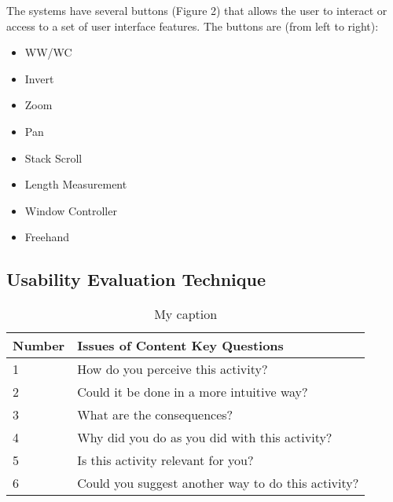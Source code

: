 The systems have several buttons (Figure 2) that allows the user to interact or access to a set of user interface features. The buttons are (from left to right):

\begin{itemize}
  \item WW/WC
  \item Invert
  \item Zoom
  \item Pan
  \item Stack Scroll
  \item Length Measurement
  \item Window Controller
  \item Freehand
\end{itemize}

\subsection{Usability Evaluation Technique}

\begin{table}[h]
\centering
\label{table:key_questions}
\begin{tabular}{l|l}
Number & Issues of Content Key Questions                    \\ \hline
1      & How do you perceive this activity?                 \\
2      & Could it be done in a more intuitive way?          \\
3      & What are the consequences?                         \\
4      & Why did you do as you did with this activity?      \\
5      & Is this activity relevant for you?                 \\
6      & Could you suggest another way to do this activity?
\end{tabular}
\caption{My caption}
\end{table}

\clearpage